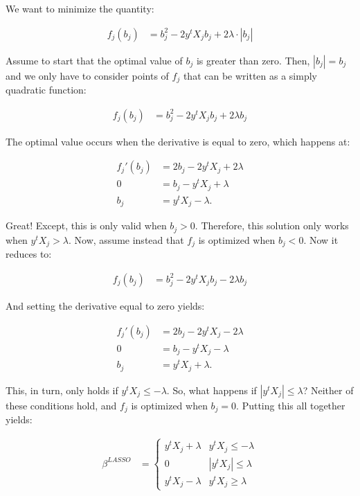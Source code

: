 \documentclass[12pt,hidelinks]{article}
\numberwithin{equation}{section}
\begin{document}
We want to minimize the quantity:

\begin{align*}
f_j(b_j) &= b_j^2 - 2  y^t X_j b_j + 2 \lambda \cdot | b_j |
\end{align*}

Assume to start that the optimal value of $b_j$ is greater than zero. Then,
$| b_j | = b_j$ and we only have to consider points of $f_j$ that can be written
as a simply quadratic function:

\begin{align*}
f_j(b_j) &= b_j^2 - 2  y^t X_j b_j + 2 \lambda  b_j
\end{align*}

The optimal value occurs when the derivative is equal to zero, which happens at:

\begin{align*}
f_j'(b_j) &= 2 b_j - 2  y^t X_j + 2 \lambda \\
0 &= b_j - y^t X_j + \lambda \\
b_j &= y^t X_j - \lambda.
\end{align*}

Great! Except, this is only valid when $b_j > 0$. Therefore, this solution only
works when $y^t X_j > \lambda$. Now, assume instead that $f_j$ is optimized when
$b_j < 0$. Now it reduces to:

\begin{align*}
f_j(b_j) &= b_j^2 - 2  y^t X_j b_j - 2 \lambda  b_j
\end{align*}

And setting the derivative equal to zero yields:

\begin{align*}
f_j'(b_j) &= 2 b_j - 2  y^t X_j - 2 \lambda \\
0 &= b_j - y^t X_j - \lambda \\
b_j &= y^t X_j + \lambda.
\end{align*}

This, in turn, only holds if $y^t X_j \leq -\lambda$. So, what happens if
$|y^t X_j| \leq \lambda$? Neither of these conditions hold, and $f_j$ is optimized
when $b_j = 0$. Putting this all together yields:

\begin{align*}
\beta^{LASSO} &= \begin{cases} y^t X_j + \lambda & y^t X_j \leq -\lambda \\
                               0 & |y^t X_j| \leq \lambda \\
                               y^t X_j - \lambda & y^t X_j \geq \lambda \end{cases}
\end{align*}
\end{document}
